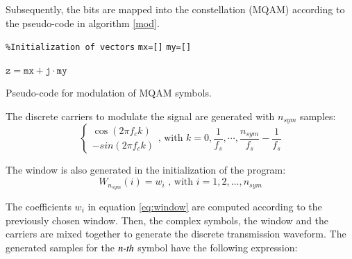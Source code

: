 \documentclass[12pt,a4paper,openright]{report}
\begin{document}
Subsequently, the bits are mapped into the constellation (MQAM) according to the pseudo-code in algorithm \ref{mod}. 


\begin{algorithm}[H]
\BlankLine
\texttt{\%Initialization of vectors}\;
\texttt{mx=[]}\;
\texttt{my=[]}\;

$\mathtt{z = mx + j \cdot my}$
\caption{Pseudo-code for modulation of MQAM symbols.}
\label{mod}
\end{algorithm}

 The discrete carriers to modulate the signal are generated with $n_{sym}$ samples:
\begin{equation}
\left\{ \begin{array}{l}
\cos (2\pi f_ck)\\
 - sin(2\pi f_ck)
\end{array} \right.\text{, with }  k = 0,\frac{1}{{f_s}},\cdots,\frac{{n_{sym}}}{{f_s}} - \frac{1}{{f_s}}
\label{eq:MQAMdiscCarriers}
\end{equation}

The window is also generated in the initialization of the program:
\begin{equation}\label{eq:window}
W_{n_{sym}}(i) = w_i\text{ , with }i = 1,2,\dots,n_{sym}
\end{equation}

 The coefficients $w_i$ in equation \ref{eq:window} are computed according to the previously chosen window. Then, the complex symbols, the window and the carriers are mixed together to generate the discrete transmission waveform. The generated samples for the $\emph{n-th}$ symbol have the following expression:
\end{document}
